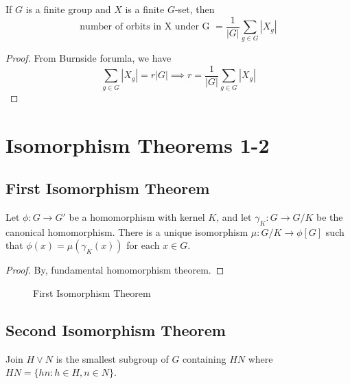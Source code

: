 \begin{corollary}
	If $G$ is a finite group and $X$ is a finite $G$-set, then
	\begin{equation}
		\text{number of orbits in X under G } = \frac{1}{|G|} \sum_{g \in G} |X_g|
	\end{equation}
\end{corollary}
\begin{proof}
	From Burnside forumla, we have
	\[\sum\limits_{g \in G}|X_g| = r|G| \implies r = \frac{1}{|G|} \sum\limits_{g \in G} |X_g|\]
\end{proof}

\section{Isomorphism Theorems 1-2}
\subsection{First Isomorphism Theorem}
\begin{theorem}
	Let $\phi : G \to G'$ be a homomorphism with kernel $K$, and let $\gamma_K : G \to G/K$ be the canonical homomorphism.
	There is a unique isomorphism $\mu : G/K \to \phi[G]$ such that $\phi(x) = \mu(\gamma_K(x))$ for each $x \in G$.
\end{theorem}
\begin{proof}
	By, fundamental homomorphism theorem.\cite[\S14.1]{fraleigh}
\end{proof}
\begin{figure}[h]
	\centering
	\caption{First Isomorphism Theorem}
\end{figure}

\subsection{Second Isomorphism Theorem}
\begin{definition}

	Join $H \vee N$ is the smallest subgroup of $G$ containing $HN$ where $HN = \{ hn : h \in H, n \in N\}$.
\end{definition}

